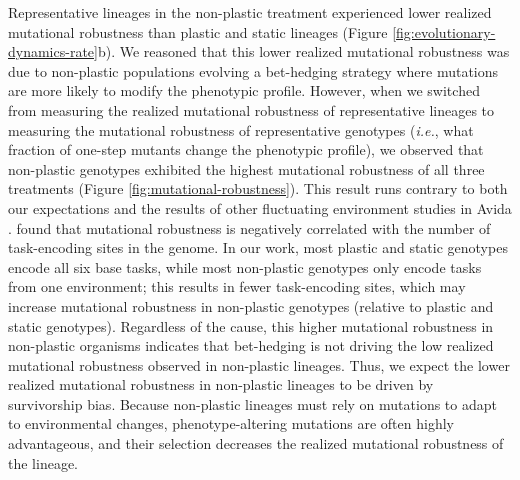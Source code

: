 Representative lineages in the non-plastic treatment experienced lower realized mutational robustness than plastic and static lineages (Figure \ref{fig:evolutionary-dynamics-rate}b).
We reasoned that this lower realized mutational robustness was due to non-plastic populations evolving a bet-hedging strategy where mutations are more likely to modify the phenotypic profile. 
However, when we switched from measuring the realized mutational robustness of representative lineages to measuring the mutational robustness of representative genotypes (\textit{i.e.}, what fraction of one-step mutants change the phenotypic profile), we observed that non-plastic genotypes exhibited the highest mutational robustness of all three treatments (Figure \ref{fig:mutational-robustness}).
This result runs contrary to both our expectations and the results of other fluctuating environment studies in Avida \citep{canino-koning_fluctuating_2019}.
\cite{canino-koning_fluctuating_2019} found that mutational robustness is negatively correlated with the number of task-encoding sites in the genome.
In our work, most plastic and static genotypes encode all six base tasks, while most non-plastic genotypes only encode tasks from one environment; this results in fewer task-encoding sites, which may increase mutational robustness in non-plastic genotypes (relative to plastic and static genotypes). %
Regardless of the cause, this higher mutational robustness in non-plastic organisms indicates that bet-hedging is not driving the low realized mutational robustness observed in non-plastic lineages.
Thus, we expect the lower realized mutational robustness in non-plastic lineages to be driven by survivorship bias. 
Because non-plastic lineages must rely on mutations to adapt to environmental changes, phenotype-altering mutations are often highly advantageous, and their selection decreases the realized mutational robustness of the lineage. 


